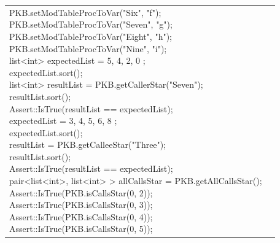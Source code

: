 \documentclass[12pt]{article}
\begin{document}
{{{{{{{{{{{{{\begin{longtable}{|L{5cm} | L{12cm}| }
{	\hspace{9mm} PKB.setModTableProcToVar("Six", "f"); \newline
	\hspace{9mm} PKB.setModTableProcToVar("Seven", "g"); \newline
	\hspace{9mm} PKB.setModTableProcToVar("Eight", "h"); \newline
	\hspace{9mm} PKB.setModTableProcToVar("Nine", "i"); \newline
    \hspace{9mm} list<int> expectedList = { 5, 4, 2, 0 }; \newline
	\hspace{9mm} expectedList.sort(); \newline
	\hspace{9mm} list<int> resultList = PKB.getCallerStar("Seven"); \newline
	\hspace{9mm} resultList.sort(); \newline
	\hspace{9mm} Assert::IsTrue(resultList == expectedList); \newline
	\hspace{9mm} expectedList = { 3, 4, 5, 6, 8 }; \newline
	\hspace{9mm} expectedList.sort(); \newline
	\hspace{9mm} resultList = PKB.getCalleeStar("Three"); \newline
	\hspace{9mm} resultList.sort(); \newline
	\hspace{9mm} Assert::IsTrue(resultList == expectedList); \newline
	\hspace{9mm} pair<list<int>, list<int> > allCallsStar = PKB.getAllCallsStar(); \newline
	\hspace{9mm} Assert::IsTrue(PKB.isCallsStar(0, 2)); \newline
	\hspace{9mm} Assert::IsTrue(PKB.isCallsStar(0, 3)); \newline
	\hspace{9mm} Assert::IsTrue(PKB.isCallsStar(0, 4)); \newline
	\hspace{9mm} Assert::IsTrue(PKB.isCallsStar(0, 5)); \newline
}
\end{longtable}}}}}}}}}}}}}}
\end{document}
